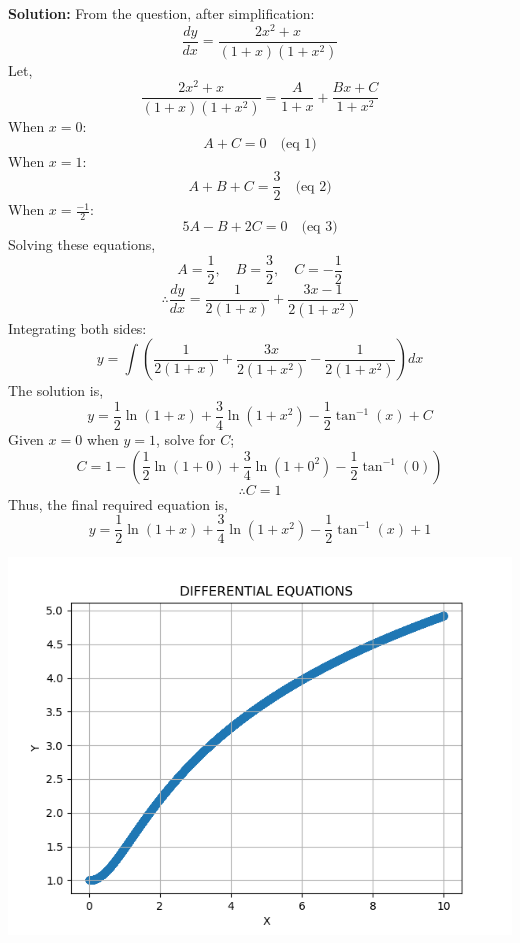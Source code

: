 \documentclass[journal]{IEEEtran}
\begin{document}
\textbf{Solution:}
From the question, after simplification:
$$
\frac{dy}{dx}= \frac{2x^2 + x}{(1+x)(1+x^2)}
$$
Let,
$$
\frac{2x^2 + x}{(1+x)(1+x^2)} = \frac{A}{1+x} + \frac{Bx+C}{1+x^2}
$$
When $x = 0$:
$$
A + C = 0 \quad \text{(eq 1)}
$$
When $x = 1$:
$$
A + B + C = \frac{3}{2} \quad \text{(eq 2)}
$$
When $x = \frac{-1}{2}$:
$$
5A -B + 2C = 0 \quad \text{(eq 3)}
$$
Solving these equations,
$$
A = \frac{1}{2}, \quad B = \frac{3}{2}, \quad C = -\frac{1}{2}
$$
$$
\therefore \frac{dy}{dx} = \frac{1}{2(1+x)} + \frac{3x-1}{2(1+x^2)}
$$
Integrating both sides:
$$
y = \int \left(\frac{1}{2(1+x)} + \frac{3x}{2(1+x^2)} - \frac{1}{2(1+x^2)}\right) dx
$$
The solution is,
$$
y = \frac{1}{2} \ln(1+x) + \frac{3}{4} \ln(1+x^2) - \frac{1}{2} \tan^{-1}(x) + C
$$
Given $x = 0$ when $y = 1$, solve for $C$;
$$
C = 1 - \left(\frac{1}{2} \ln(1+0) + \frac{3}{4} \ln(1+0^2) - \frac{1}{2} \tan^{-1}(0)\right)
$$
$$
\therefore C = 1
$$
Thus, the final required equation is,
$$
y = \frac{1}{2} \ln(1+x) + \frac{3}{4} \ln(1+x^2) - \frac{1}{2} \tan^{-1}(x) + 1
$$
\begin{center}
    \includegraphics[scale=0.5]{fig/fig.png}
\end{center}
\end{document}
